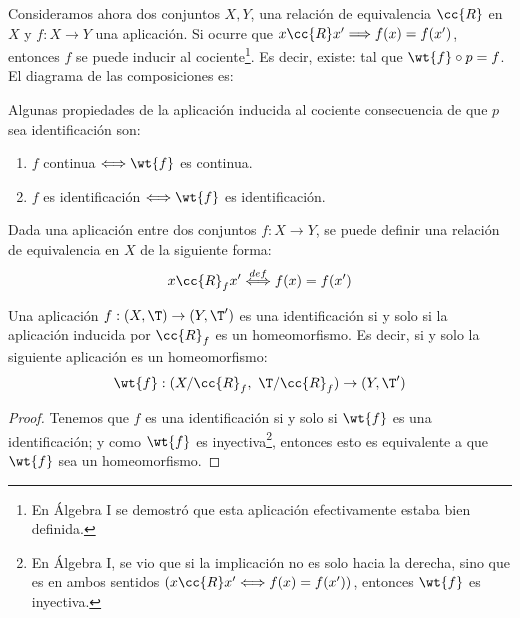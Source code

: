 Consideramos ahora dos conjuntos $X,Y$, una relación de equivalencia $\cc{R}$ en $X$ y $f:X\to Y$ una aplicación. Si ocurre que $x\cc{R}x'\Longrightarrow f(x)=f(x')$, entonces $f$ se puede inducir al cociente\footnote{En Álgebra I se demostró que esta aplicación efectivamente estaba bien definida.}. Es decir, existe:
tal que $\wt{f}\circ p =f$. El diagrama de las composiciones es:
\begin{figure}[H]
    \centering
\end{figure}
Algunas propiedades de la aplicación inducida al cociente consecuencia de que $p$ sea identificación son:
\begin{enumerate}
    \item $f$ continua $\Longleftrightarrow \wt{f}$ es continua.
    \item $f$ es identificación $\Longleftrightarrow \wt{f}$ es identificación.
\end{enumerate}


Dada una aplicación entre dos conjuntos $f:X\to Y$, se puede definir una relación de equivalencia en $X$ de la siguiente forma:
\begin{equation*}
    x\cc{R}_f x' \stackrel{def}{\Longleftrightarrow} f(x)=f(x')
\end{equation*}


\begin{teo}
    Una aplicación $f:(X,\T)\to (Y,\T')$ es una identificación si y solo si la aplicación inducida por $\cc{R}_f$ es un homeomorfismo. Es decir, si y solo la siguiente aplicación es un homeomorfismo:
    \begin{equation*}
        \wt{f}:(X/\cc{R}_f,~\T/\cc{R}_f) \to (Y,\T')
    \end{equation*}
\end{teo}
\begin{proof}
    Tenemos que $f$ es una identificación si y solo si $\wt{f}$ es una identificación; y como $\wt{f}$ es inyectiva\footnote{En Álgebra I, se vio que si la implicación no es solo hacia la derecha, sino que es en ambos sentidos $(x\cc{R}x'\Longleftrightarrow f(x)=f(x'))$, entonces $\wt{f}$ es inyectiva.}, entonces esto es equivalente a que $\wt{f}$ sea un homeomorfismo.
\end{proof}


